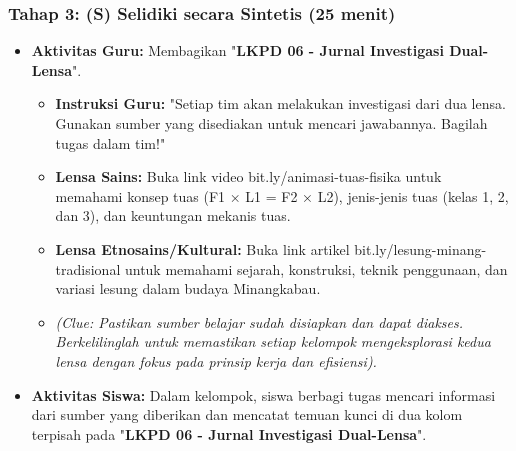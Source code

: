 \documentclass[a4paper,12pt]{article}
\begin{document}
\subsubsection{Tahap 3: (S) Selidiki secara Sintetis (25 menit)}
\begin{itemize}
\item \textbf{Aktivitas Guru:} Membagikan "\textbf{LKPD 06 - Jurnal Investigasi Dual-Lensa}".
    \begin{itemize}
    \item \textbf{Instruksi Guru:} "Setiap tim akan melakukan investigasi dari dua lensa. Gunakan sumber yang disediakan untuk mencari jawabannya. Bagilah tugas dalam tim!"
    \item \textbf{Lensa Sains:} Buka link video bit.ly/animasi-tuas-fisika untuk memahami konsep tuas (F1 × L1 = F2 × L2), jenis-jenis tuas (kelas 1, 2, dan 3), dan keuntungan mekanis tuas.
    \item \textbf{Lensa Etnosains/Kultural:} Buka link artikel bit.ly/lesung-minang-tradisional untuk memahami sejarah, konstruksi, teknik penggunaan, dan variasi lesung dalam budaya Minangkabau.
    \item \textit{(Clue: Pastikan sumber belajar sudah disiapkan dan dapat diakses. Berkelilinglah untuk memastikan setiap kelompok mengeksplorasi kedua lensa dengan fokus pada prinsip kerja dan efisiensi).}
    \end{itemize}
\item \textbf{Aktivitas Siswa:} Dalam kelompok, siswa berbagi tugas mencari informasi dari sumber yang diberikan dan mencatat temuan kunci di dua kolom terpisah pada "\textbf{LKPD 06 - Jurnal Investigasi Dual-Lensa}".
\end{itemize}
\end{document}
